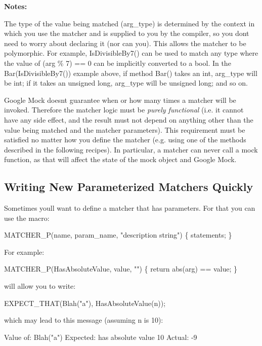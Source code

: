 {\bfseries Notes\+:}


\begin{DoxyEnumerate}
\item The type of the value being matched ({\ttfamily arg\+\_\+type}) is determined by the context in which you use the matcher and is supplied to you by the compiler, so you don\textquotesingle{}t need to worry about declaring it (nor can you). This allows the matcher to be polymorphic. For example, {\ttfamily Is\+Divisible\+By7()} can be used to match any type where the value of {\ttfamily (arg \% 7) == 0} can be implicitly converted to a {\ttfamily bool}. In the {\ttfamily Bar(\+Is\+Divisible\+By7())} example above, if method {\ttfamily Bar()} takes an {\ttfamily int}, {\ttfamily arg\+\_\+type} will be {\ttfamily int}; if it takes an {\ttfamily unsigned long}, {\ttfamily arg\+\_\+type} will be {\ttfamily unsigned long}; and so on.
\end{DoxyEnumerate}
\begin{DoxyEnumerate}
\item Google Mock doesn\textquotesingle{}t guarantee when or how many times a matcher will be invoked. Therefore the matcher logic must be {\itshape purely functional} (i.\+e. it cannot have any side effect, and the result must not depend on anything other than the value being matched and the matcher parameters). This requirement must be satisfied no matter how you define the matcher (e.\+g. using one of the methods described in the following recipes). In particular, a matcher can never call a mock function, as that will affect the state of the mock object and Google Mock.
\end{DoxyEnumerate}

\subsection*{Writing New Parameterized Matchers Quickly}

Sometimes you\textquotesingle{}ll want to define a matcher that has parameters. For that you can use the macro\+: 
\begin{DoxyCode}
MATCHER\_P(name, param\_name, "description string") \{ statements; \}
\end{DoxyCode}


For example\+: 
\begin{DoxyCode}
MATCHER\_P(HasAbsoluteValue, value, "") \{ return abs(arg) == value; \}
\end{DoxyCode}
 will allow you to write\+: 
\begin{DoxyCode}
EXPECT\_THAT(Blah("a"), HasAbsoluteValue(n));
\end{DoxyCode}
 which may lead to this message (assuming {\ttfamily n} is 10)\+: 
\begin{DoxyCode}
Value of: Blah("a")
Expected: has absolute value 10
  Actual: -9
\end{DoxyCode}


